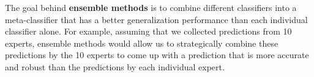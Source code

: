 \documentclass{article}
\begin{document}



The goal behind \textbf{ensemble methods} is to combine different classifiers into a meta-classifier that has a better generalization performance than each individual classifier alone. For example, assuming that we collected predictions from 10 experts, ensemble methods would allow us to strategically combine these predictions by the 10 experts to come up with a prediction that is more accurate and robust than the predictions by each individual expert.

\end{document}
